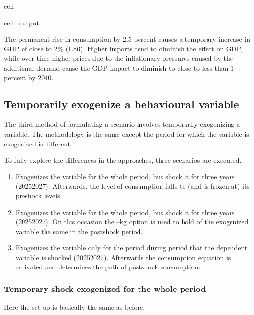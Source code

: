\documentclass[letterpaper,10pt,english]{jupyterBook}
\begin{document}
\begin{sphinxuseclass}{cell}
\begin{sphinxVerbatimOutput}
\begin{sphinxuseclass}{cell_output}
\end{sphinxuseclass}\end{sphinxVerbatimOutput}

\end{sphinxuseclass}
\sphinxAtStartPar
The permanent rise in consumption by 2.5 percent causes a temporary increase in GDP of close to 2\% (1.86). Higher imports tend to diminish the effect on GDP, while over time higher prices due to the inflationary pressures caused by the additional demand cause the GDP impact to diminish to close to less than 1 percent by 2040.


\subsection{Temporarily exogenize a behavioural variable}
\label{\detokenize{content/06_WBModels/ScenarioAnalysis:temporarily-exogenize-a-behavioural-variable}}
\sphinxAtStartPar
The third method of formulating a scenario involves temporarily exogenizing a variable.    The methodology is the same except the period for which the variable is exogenized is different.

\sphinxAtStartPar
To fully explore the differences in the approaches, three scenarios are executed.
\begin{enumerate}
%
\item {} 
\sphinxAtStartPar
Exogenizes the variable for the whole period, but shock it for three years (2025\sphinxhyphen{}2027). Afterwards, the level of consumption falls to (and is frozen at) its pre\sphinxhyphen{}shock levels.

\item {} 
\sphinxAtStartPar
Exogenizes the variable for the whole period, but shock it for three years (2025\sphinxhyphen{}2027). On this occasion the –kg option is used to hold  of the exogenized variable the same in the post\sphinxhyphen{}shock period.

\item {} 
\sphinxAtStartPar
Exogenizes the variable only for the period during period that the dependent variable is shocked (2025\sphinxhyphen{}2027). Afterwards the consumption equation is activated and determines the path of post\sphinxhyphen{}shock consumption.

\end{enumerate}


\subsubsection{Temporary shock exogenized for the whole period}
\label{\detokenize{content/06_WBModels/ScenarioAnalysis:temporary-shock-exogenized-for-the-whole-period}}
\sphinxAtStartPar
Here the set up is basically the same as before.
\end{document}
